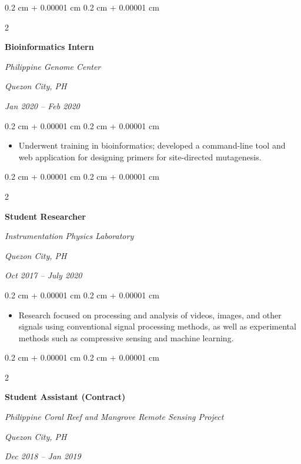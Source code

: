 \documentclass[10pt, a4paper]{article}
\newenvironment{highlights}{
    \begin{itemize}[
        topsep=0.10 cm,
        parsep=0.10 cm,
        partopsep=0pt,
        itemsep=0pt,
        leftmargin=0.4 cm + 10pt
    ]
}{
    \end{itemize}
} %
\newenvironment{onecolentry}{
    \begin{adjustwidth}{
        0.2 cm + 0.00001 cm
    }{
        0.2 cm + 0.00001 cm
    }
}{
    \end{adjustwidth}
} %
\newenvironment{twocolentry}[2][]{
    \onecolentry
    \def\secondColumn{#2}
    \setcolumnwidth{\fill, 4.5 cm}
    \begin{paracol}{2}
}{
    \switchcolumn \raggedleft \secondColumn
    \end{paracol}
    \endonecolentry
} %
\begin{document}
        \vspace{0.2 cm}

        \begin{twocolentry}{
        \textit{Quezon City, PH}    
            
        \textit{Jan 2020 – Feb 2020}}
            \textbf{Bioinformatics Intern}
            
            \textit{Philippine Genome Center}
        \end{twocolentry}

        \vspace{0.10 cm}
        \begin{onecolentry}
            \begin{highlights}
                \item Underwent training in bioinformatics; developed a command-line tool and web application for designing  primers for site-directed mutagenesis.

            \end{highlights}
        \end{onecolentry}


        \vspace{0.2 cm}

        \begin{twocolentry}{
        \textit{Quezon City, PH}    
            
        \textit{Oct 2017 – July 2020}}
            \textbf{Student Researcher}
            
            \textit{Instrumentation Physics Laboratory}
        \end{twocolentry}

        \vspace{0.10 cm}
        \begin{onecolentry}
            \begin{highlights}
                \item Research focused on processing and analysis of videos, images, and other signals using conventional signal processing methods, as well as experimental methods such as compressive sensing and machine learning.
            \end{highlights}
        \end{onecolentry}


        \vspace{0.2 cm}

        \begin{twocolentry}{
        \textit{Quezon City, PH}    
            
        \textit{Dec 2018 – Jan 2019}}
            \textbf{Student Assistant (Contract)}
            
            \textit{Philippine Coral Reef and Mangrove Remote Sensing Project}
        \end{twocolentry}
\end{document}
